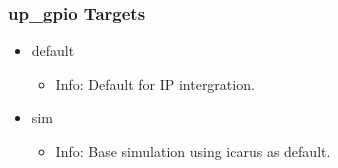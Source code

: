 \subsubsection{up\_gpio Targets}
\begin{itemize}
\item default
	\begin{itemize}
	\item[$\space$] Info: Default for IP intergration.
	\end{itemize}
\item sim
	\begin{itemize}
	\item[$\space$] Info: Base simulation using icarus as default.
	\end{itemize}
\end{itemize}
